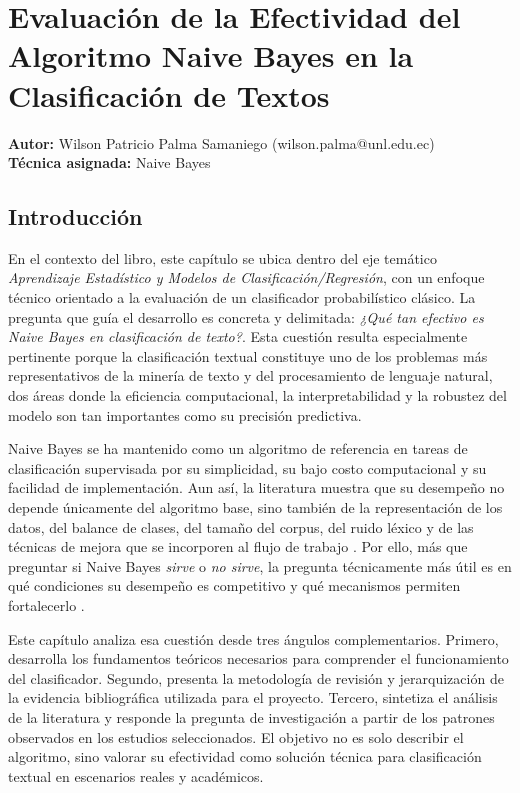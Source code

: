 
\chapter{Evaluación de la Efectividad del Algoritmo Naive Bayes en la Clasificación de Textos}
\label{cap:capitulo_04}

\textbf{Autor:} Wilson Patricio Palma Samaniego (wilson.palma@unl.edu.ec) \\
\textbf{Técnica asignada:} Naive Bayes \\

\section{Introducción}

En el contexto del libro, este capítulo se ubica dentro del eje temático \textit{Aprendizaje Estadístico y Modelos de Clasificación/Regresión}, con un enfoque técnico orientado a la evaluación de un clasificador probabilístico clásico. La pregunta que guía el desarrollo es concreta y delimitada: \textit{¿Qué tan efectivo es Naive Bayes en clasificación de texto?}. Esta cuestión resulta especialmente pertinente porque la clasificación textual constituye uno de los problemas más representativos de la minería de texto y del procesamiento de lenguaje natural, dos áreas donde la eficiencia computacional, la interpretabilidad y la robustez del modelo son tan importantes como su precisión predictiva.

Naive Bayes se ha mantenido como un algoritmo de referencia en tareas de clasificación supervisada por su simplicidad, su bajo costo computacional y su facilidad de implementación. Aun así, la literatura muestra que su desempeño no depende únicamente del algoritmo base, sino también de la representación de los datos, del balance de clases, del tamaño del corpus, del ruido léxico y de las técnicas de mejora que se incorporen al flujo de trabajo \cite{Kim2006,Frank2006,Kibriya2005}. Por ello, más que preguntar si Naive Bayes \textit{sirve} o \textit{no sirve}, la pregunta técnicamente más útil es en qué condiciones su desempeño es competitivo y qué mecanismos permiten fortalecerlo \cite{Jiang2016,10.1145/2911451.2911547}.

Este capítulo analiza esa cuestión desde tres ángulos complementarios. Primero, desarrolla los fundamentos teóricos necesarios para comprender el funcionamiento del clasificador. Segundo, presenta la metodología de revisión y jerarquización de la evidencia bibliográfica utilizada para el proyecto. Tercero, sintetiza el análisis de la literatura y responde la pregunta de investigación a partir de los patrones observados en los estudios seleccionados. El objetivo no es solo describir el algoritmo, sino valorar su efectividad como solución técnica para clasificación textual en escenarios reales y académicos.

